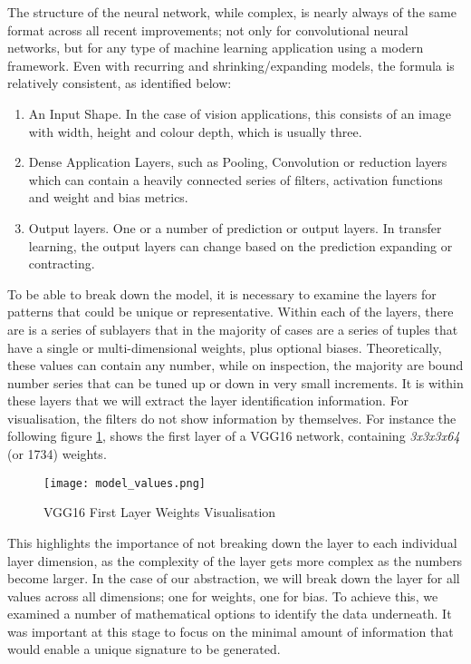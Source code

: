 The structure of the neural network, while complex, is nearly always of the same format across all recent improvements; not only for convolutional neural networks, but for any type of machine learning application using a modern framework. Even with recurring and shrinking/expanding models, the formula is relatively consistent, as identified below:

\begin{enumerate}
\item An Input Shape. In the case of vision applications, this consists of an image with width, height and colour depth, which is usually three.
\item Dense Application Layers, such as Pooling, Convolution or reduction layers which can contain a heavily connected series of filters, activation functions and weight and bias metrics.
\item Output layers. One or a number of prediction or output layers. In transfer learning, the output layers can change based on the prediction expanding or contracting.
\end{enumerate}

To be able to break down the model, it is necessary to examine the layers for patterns that could be unique or representative. Within each of the layers, there are is a series of sublayers that in the majority of cases are a series of tuples that have a single or multi-dimensional weights, plus optional biases. Theoretically, these values can contain any number, while on inspection, the majority are bound number series that can be tuned up or down in very small increments. It is within these layers that we will extract the layer identification information. For visualisation, the filters do not show information by themselves. For instance the following figure \ref{fig:vggWeightVisualisation}, shows the first layer of a VGG16 network\cite{brownleeHowVisualizeFilters2019}, containing \textit{3x3x3x64} (or 1734) weights.

\begin{figure}[!ht]
    \centering
    \texttt{[image: model\_values.png]}
    \caption{VGG16 First Layer Weights Visualisation}
    \label{fig:vggWeightVisualisation}
\end{figure}

This highlights the importance of not breaking down the layer to each individual layer dimension, as the complexity of the layer gets more complex as the numbers become larger. In the case of our abstraction, we will break down the layer for all values across all dimensions; one for weights, one for bias. To achieve this, we examined a number of mathematical options to identify the data underneath. It was important at this stage to focus on the minimal amount of information that would enable a unique signature to be generated.

